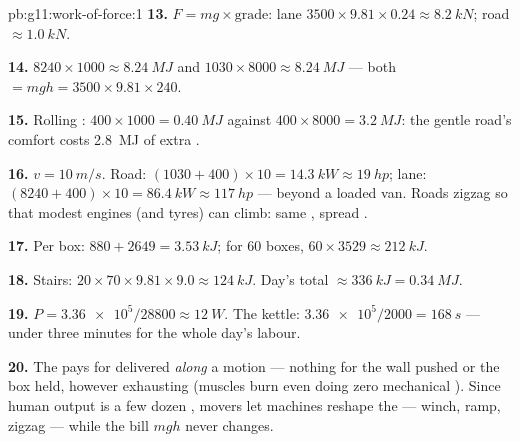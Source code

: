 \begin{solution}{pb:g11:work-of-force:1}
\textbf{13.} $F = mg \times \text{grade}$: lane
$3500 \times 9.81 \times 0.24 \approx \qty{8.2}{kN}$; road
$\approx \qty{1.0}{kN}$.

\textbf{14.} $8240 \times 1000 \approx \qty{8.24}{MJ}$ and
$1030 \times 8000 \approx \qty{8.24}{MJ}$ --- both $= mgh = 3500
\times 9.81 \times 240$.

\textbf{15.} Rolling : $400 \times 1000 = \qty{0.40}{MJ}$
against $400 \times 8000 = \qty{3.2}{MJ}$: the gentle road's comfort
costs \qty{2.8}{MJ} of extra .

\textbf{16.} $v = \qty{10}{m/s}$. Road:
$(1030 + 400) \times 10 = \qty{14.3}{kW} \approx \qty{19}{hp}$; lane:
$(8240 + 400) \times 10 = \qty{86.4}{kW} \approx \qty{117}{hp}$ ---
beyond a loaded van. Roads zigzag so that modest engines (and tyres)
can climb: same , spread .

\textbf{17.} Per box: $880 + 2649 = \qty{3.53}{kJ}$; for $60$ boxes,
$60 \times 3529 \approx \qty{212}{kJ}$.

\textbf{18.} Stairs: $20 \times 70 \times 9.81 \times 9.0 \approx
\qty{124}{kJ}$. Day's total $\approx \qty{336}{kJ} = \qty{0.34}{MJ}$.

\textbf{19.} $P = \num{3.36e5}/28800 \approx \qty{12}{W}$. The kettle:
$\num{3.36e5}/2000 = \qty{168}{s}$ --- under three minutes for the
whole day's labour.

\textbf{20.} The  pays for  delivered \emph{along} a motion
--- nothing for the wall pushed or the box held, however exhausting
(muscles burn  even doing zero mechanical ). Since
human  output is a few dozen , movers let machines reshape
the  --- winch, ramp, zigzag --- while the bill $mgh$ never
changes.
\end{solution}
